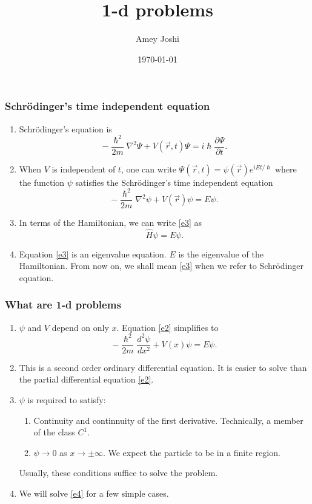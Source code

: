\documentclass{beamer}
\title{1-d problems}
\author{Amey Joshi}
\date{\today}
\begin{document}
\begin{frame}
\titlepage
\end{frame}

\begin{frame}
\frametitle{Schr\"{o}dinger's time independent equation}
\begin{enumerate}
\item Schr\"{o}dinger's equation is
\begin{equation}\label{e1}
-\frac{\hslash^2}{2m}\nabla^2\Psi + V(\vec{r},t)\Psi = i\hslash
\frac{\partial\Psi}{\partial t}.
\end{equation}
\item When $V$ is independent of $t$, one can write $ \Psi(\vec{r}, t) = 
\psi(\vec{r})e^{iEt/\hslash}$ where the function $\psi$ satisfies the 
Schr\"{o}dinger's time independent equation
\begin{equation}\label{e2}
-\frac{\hslash^2}{2m}\nabla^2\psi + V(\vec{r})\psi = E\psi.
\end{equation}
\item In terms of the Hamiltonian, we can write \eqref{e3} as
\begin{equation}\label{e3}
\hat{H}\psi = E\psi.
\end{equation}
\item Equation \eqref{e3} is an eigenvalue equation. $E$ is the eigenvalue of
the Hamiltonian. From now on, we shall mean \eqref{e3} when we refer to 
Schr\"{o}dinger equation.
\end{enumerate}
\end{frame}

\begin{frame}
\frametitle{What are 1-d problems}
\begin{enumerate}
\item $\psi$ and $V$  depend on only $x$. Equation \eqref{e2} simplifies to
\begin{equation}\label{e4}
-\frac{\hslash^2}{2m}\frac{d^2\psi}{dx^2} + V(x)\psi = E\psi.
\end{equation}
\item This is a second order ordinary differential equation. It is easier to
solve than the partial differential equation \eqref{e2}.
\item $\psi$ is required to satisfy:
\begin{enumerate}
\item Continuity and continnuity of the first derivative. Technically, a member
of the class $C^1$.
\item $\psi \rightarrow 0$ as $x \rightarrow \pm\infty$. We expect the particle
to be in a finite region.
\end{enumerate}
Usually, these conditions suffice to solve the problem.
\item We will solve \eqref{e4} for a few simple cases.
\end{enumerate}
\end{frame}
\end{document}
